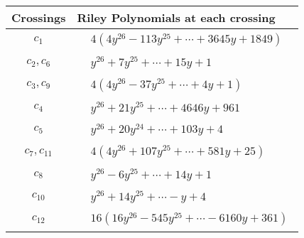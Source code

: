\documentclass[1p]{elsarticle_modified}
\theoremstyle{definition}
\begin{document}
\begin{tabular}{m{50pt}|m{274pt}}
Crossings & \hspace{64pt}Riley Polynomials at each crossing \\
\hline $$\begin{aligned}c_{1}\end{aligned}$$&$\begin{aligned}
&4(4 y^{26}-113 y^{25}+\cdots+3645 y+1849)
\end{aligned}$\\
\hline $$\begin{aligned}c_{2},c_{6}\end{aligned}$$&$\begin{aligned}
&y^{26}+7 y^{25}+\cdots+15 y+1
\end{aligned}$\\
\hline $$\begin{aligned}c_{3},c_{9}\end{aligned}$$&$\begin{aligned}
&4(4 y^{26}-37 y^{25}+\cdots+4 y+1)
\end{aligned}$\\
\hline $$\begin{aligned}c_{4}\end{aligned}$$&$\begin{aligned}
&y^{26}+21 y^{25}+\cdots+4646 y+961
\end{aligned}$\\
\hline $$\begin{aligned}c_{5}\end{aligned}$$&$\begin{aligned}
&y^{26}+20 y^{24}+\cdots+103 y+4
\end{aligned}$\\
\hline $$\begin{aligned}c_{7},c_{11}\end{aligned}$$&$\begin{aligned}
&4(4 y^{26}+107 y^{25}+\cdots+581 y+25)
\end{aligned}$\\
\hline $$\begin{aligned}c_{8}\end{aligned}$$&$\begin{aligned}
&y^{26}-6 y^{25}+\cdots+14 y+1
\end{aligned}$\\
\hline $$\begin{aligned}c_{10}\end{aligned}$$&$\begin{aligned}
&y^{26}+14 y^{25}+\cdots- y+4
\end{aligned}$\\
\hline $$\begin{aligned}c_{12}\end{aligned}$$&$\begin{aligned}
&16(16 y^{26}-545 y^{25}+\cdots-6160 y+361)
\end{aligned}$\\
\hline
\end{tabular}\\~\\
\end{document}
